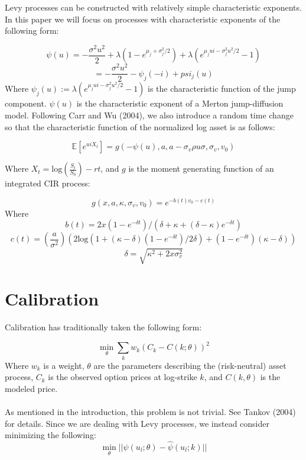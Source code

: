 \documentclass{article}
\begin{document}
Levy processes can be constructed with relatively simple characteristic exponents.  In this paper we will focus on processes with characteristic exponents of the following form:

\[\psi(u)=-\frac{\sigma^2 u^2}{2}+\lambda \left(1-e^{\mu_j+\sigma_j ^2 /2}\right)+\lambda \left(e^{\mu_j u i-\sigma_j ^2 u^2 /2}-1\right)\]
\[=-\frac{\sigma^2 u^2}{2}-\psi_j(-i)+psi_j(u)\]
Where \(\psi_j(u):=\lambda \left( e^{\mu_j u i-\sigma_j ^2 u^2 /2}-1 \right)\) is the characteristic function of the jump component.  \(\psi(u)\) is the characteristic exponent of a Merton jump-diffusion model.  Following Carr and Wu (2004), we also introduce a random time change so that the characteristic function of the normalized log asset is as follows:

\[\mathbb{E}[e^{ui X_t}]=g(-\psi(u), a, a-\sigma_v \rho u \sigma, \sigma_v, v_0)  \]

Where \(X_t=\mathrm{log}\left(\frac{S_t}{S_0}\right)-rt \), and \(g\) is the moment generating function of an integrated CIR process:

\[g(x, a, \kappa, \sigma_v, v_0)=e^{-b(t)v_0-c(t)}\]
Where 
\[b(t)=2x\left(1-e^{-\delta t}\right)/\left(\delta+\kappa+(\delta-\kappa) e^{-\delta t}\right)\]
\[c(t)=\left(\frac{a}{\sigma^2}\right)\left(2\mathrm{log}\left(1+(\kappa-\delta)\left(1-e^{-\delta t}\right)/2\delta \right) +\left(1-e^{-\delta t}\right)(\kappa-\delta)\right)\]
\[\delta=\sqrt{\kappa^2+2x \sigma_v^2}\]

\section{Calibration}

Calibration has traditionally taken the following form:

\[\min_\theta \sum_k w_k \left(C_k-C(k; \theta)\right)^2 \]
Where \(w_k\) is a weight, \(\theta\) are the parameters describing the (risk-neutral) asset process, \(C_k\) is the observed option prices at log-strike \(k\), and \(C(k, \theta)\) is the modeled price.  
\\
\\
As mentioned in the introduction, this problem is not trivial.  See Tankov (2004) for details.  Since we are dealing with Levy processes, we instead consider minimizing the following:
\[\min_\theta ||\psi(u_l; \theta)-\hat{\psi}(u_l; k)||\]
\end{document}
